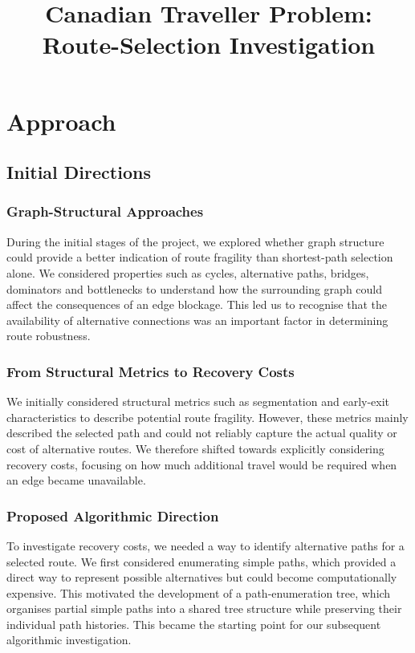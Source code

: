 \documentclass{article}
\title{Canadian Traveller Problem: Route-Selection Investigation}
\author{}
\date{}
\begin{document}
\maketitle

\section{Approach}

\subsection{Initial Directions}

\subsubsection{Graph-Structural Approaches}

During the initial stages of the project, we explored whether graph structure could provide a better indication of route fragility than shortest-path selection alone. We considered properties such as cycles, alternative paths, bridges, dominators and bottlenecks to understand how the surrounding graph could affect the consequences of an edge blockage. This led us to recognise that the availability of alternative connections was an important factor in determining route robustness.

\subsubsection{From Structural Metrics to Recovery Costs}

We initially considered structural metrics such as segmentation and early-exit characteristics to describe potential route fragility. However, these metrics mainly described the selected path and could not reliably capture the actual quality or cost of alternative routes. We therefore shifted towards explicitly considering recovery costs, focusing on how much additional travel would be required when an edge became unavailable.

\subsubsection{Proposed Algorithmic Direction}

To investigate recovery costs, we needed a way to identify alternative paths for a selected route. We first considered enumerating simple paths, which provided a direct way to represent possible alternatives but could become computationally expensive. This motivated the development of a path-enumeration tree, which organises partial simple paths into a shared tree structure while preserving their individual path histories. This became the starting point for our subsequent algorithmic investigation.
\end{document}
